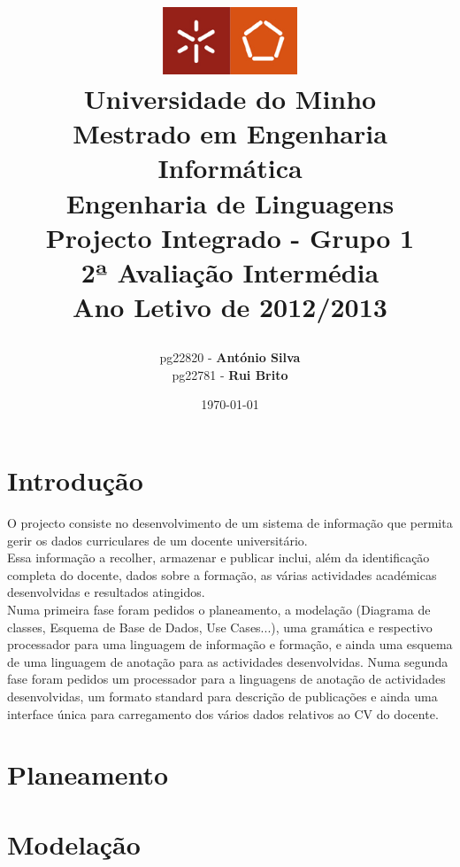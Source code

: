 \documentclass[a4paper,11pt,openright,openbib]{article}
\title{
	\large{\includegraphics[width=0.3\textwidth]{../../report-template/UM.jpg}} \\
	\large{Universidade do Minho}  \\
	\large{Mestrado em Engenharia Informática}  \\
	\large{Engenharia de Linguagens}  \\
	\large{Projecto Integrado - Grupo 1}  \\	
	\large{\textbf{2ª Avaliação Intermédia}} \\
	\large{Ano Letivo de 2012/2013} \\
	\date{\today}
}
\author{	
	\begin{tabular}[t]{c c}      
        pg22820 - \textbf{António Silva} \\        
	pg22781 - \textbf{Rui Brito} \\   				
	\\ 
	\end{tabular}
}
\begin{document}
\maketitle


\pagestyle{headings}
\newpage
\tableofcontents
\newpage

\section{Introdução}
O projecto consiste no desenvolvimento de um sistema de informação que permita gerir os dados curriculares de um docente universitário.\\
Essa informação a recolher, armazenar e publicar inclui, além da identificação completa do docente, dados sobre a formação, as várias actividades académicas desenvolvidas e resultados atingidos.\\
Numa primeira fase foram pedidos o planeamento, a modelação (Diagrama de classes, Esquema de Base de Dados, Use Cases...), uma gramática e respectivo processador para uma linguagem de informação e formação, e ainda uma esquema de uma linguagem de anotação para as actividades desenvolvidas.
Numa segunda fase foram pedidos um processador para a linguagens de anotação de actividades desenvolvidas, um formato standard para descrição de publicações e ainda uma interface única para carregamento dos vários dados relativos ao CV do docente.


\section{Planeamento}

\section{Modelação}
\end{document}
